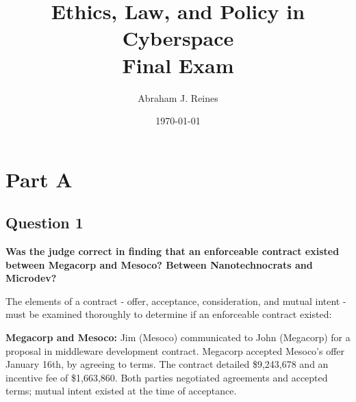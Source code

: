 \documentclass[12pt]{article}
\title{Ethics, Law, and Policy in Cyberspace\\Final Exam}
\author{Abraham J. Reines}
\date{\today}
\begin{document}
\maketitle

\section*{Part A}

\subsection*{Question 1}
\textbf{Was the judge correct in finding that an enforceable contract existed between Megacorp and Mesoco? Between Nanotechnocrats and Microdev?}

The elements of a contract - offer, acceptance, consideration, and mutual intent - must be examined thoroughly to determine if an enforceable contract existed: 

\textbf{Megacorp and Mesoco:} 
Jim (Mesoco) communicated to John (Megacorp) for a proposal in middleware development contract.
Megacorp accepted Mesoco's offer January 16th, by agreeing to terms.
The contract detailed \$9,243,678 and an incentive fee of \$1,663,860.
Both parties negotiated agreements and accepted terms; mutual intent existed at the time of acceptance.
\end{document}
